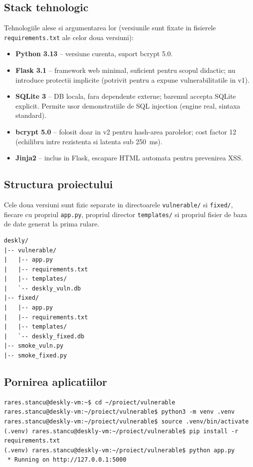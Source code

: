 \documentclass[12pt,a4paper]{article}
\begin{document}
\subsection{Stack tehnologic}
Tehnologiile alese si argumentarea lor (versiunile sunt fixate in
fisierele \texttt{requirements.txt} ale celor doua versiuni):
\begin{itemize}
  \item \textbf{Python 3.13} -- versiune curenta, suport bcrypt 5.0.
  \item \textbf{Flask 3.1} -- framework web minimal, suficient pentru
        scopul didactic; nu introduce protectii implicite (potrivit
        pentru a expune vulnerabilitatile in v1).
  \item \textbf{SQLite 3} -- DB locala, fara dependente externe;
        baremul accepta SQLite explicit. Permite usor demonstratiile
        de SQL injection (engine real, sintaxa standard).
  \item \textbf{bcrypt 5.0} -- folosit doar in v2 pentru hash-area
        parolelor; cost factor 12 (echilibru intre rezistenta si
        latenta sub 250~ms).
  \item \textbf{Jinja2} -- inclus in Flask, escapare HTML automata
        pentru prevenirea XSS.
\end{itemize}

\subsection{Structura proiectului}
Cele doua versiuni sunt fizic separate in directoarele
\texttt{vulnerable/} si \texttt{fixed/}, fiecare cu propriul
\texttt{app.py}, propriul director \texttt{templates/} si propriul
fisier de baza de date generat la prima rulare.

\begin{lstlisting}[style=sh, caption={Arborele proiectului}]
deskly/
|-- vulnerable/
|   |-- app.py                 
|   |-- requirements.txt
|   |-- templates/             
|   `-- deskly_vuln.db         
|-- fixed/
|   |-- app.py                 
|   |-- requirements.txt       
|   |-- templates/             
|   `-- deskly_fixed.db
|-- smoke_vuln.py              
|-- smoke_fixed.py             
\end{lstlisting}

\subsection{Pornirea aplicatiilor}
\begin{lstlisting}[style=sh, caption={Pornirea versiunii vulnerabile}]
rares.stancu@deskly-vm:~$ cd ~/proiect/vulnerable
rares.stancu@deskly-vm:~/proiect/vulnerable$ python3 -m venv .venv
rares.stancu@deskly-vm:~/proiect/vulnerable$ source .venv/bin/activate
(.venv) rares.stancu@deskly-vm:~/proiect/vulnerable$ pip install -r requirements.txt
(.venv) rares.stancu@deskly-vm:~/proiect/vulnerable$ python app.py
 * Running on http://127.0.0.1:5000
\end{lstlisting}
\end{document}
